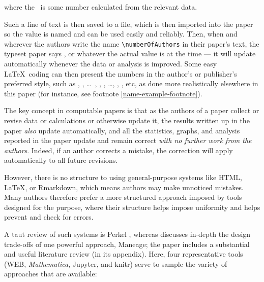 \documentclass{comjnl}
\begin{document}
where the \the\countAuthors\ is some number calculated from the relevant data. 

Such a line of text is then saved to a file, which is then imported into the paper so the value is named and can be used easily and reliably. Then, when and wherever the authors write the name \texttt{\textbackslash numberOfAuthors} in their paper's text, the typeset paper says \the\countAuthors, or whatever the actual value is at the time --- it will update automatically whenever the data or analysis is improved. Some easy \LaTeX\ coding can then present the numbers in the author's or publisher's preferred style, such as , , \ldots\ , , , \ldots, ,  , etc, as done more realistically elsewhere in this paper (for instance, see footnote \ref{name-example-footnote}). 

The key concept in computable papers is that as the authors of a paper collect or revise data or calculations or otherwise update it, the results written up in the paper \emph{also\/} update automatically, and all the statistics, graphs, and analysis reported in the paper update and remain correct \emph{with no further work from the authors}. Indeed, if an author corrects a mistake, the correction will apply automatically to all future revisions.

However, there is no structure to using general-purpose systems like HTML, \LaTeX, or Rmarkdown, which means authors may make unnoticed mistakes. Many authors therefore prefer a more structured approach imposed by tools designed for the purpose, where their structure helps impose uniformity and helps prevent and check for errors. 

A taut review of such systems is Perkel \cite{perkel-review}, whereas \cite{maneage} discusses in-depth the design trade-offs of one powerful approach, Maneage; the paper \cite{maneage} includes  a substantial and useful literature review (in its appendix). Here, four representative tools (WEB, \emph{Mathematica}, Jupyter, and knitr) serve to sample the variety of approaches that are available:
\end{document}
